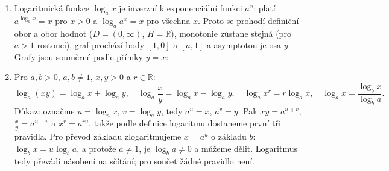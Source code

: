 \begin{enumerate}[label=\textbf{\arabic*.}, leftmargin=*, itemsep=0.8em]
  \item {}
  Logaritmická funkce $\log_a x$ je inverzní k exponenciální funkci $a^x$: platí $a^{\log_a x} = x$ pro $x > 0$ a $\log_a a^x = x$ pro všechna $x$. Proto se prohodí definiční obor a obor hodnot ($D = (0, \infty)$, $H = \mathbb{R}$), monotonie zůstane stejná (pro $a > 1$ rostoucí), graf prochází body $[1, 0]$ a $[a, 1]$ a asymptotou je osa $y$. Grafy jsou souměrné podle přímky $y = x$:
  \begin{center}
  \end{center}

  \item {}
  Pro $a, b > 0$, $a, b\neq 1$, $x, y > 0$ a $r\in\mathbb{R}$:
  \begin{equation*}
    \log_a(xy) = \log_a x + \log_a y,\quad \log_a\frac{x}{y} = \log_a x - \log_a y,\quad \log_a x^r = r\log_a x,\quad \log_a x = \frac{\log_b x}{\log_b a}.
  \end{equation*}
  Důkaz: označme $u = \log_a x$, $v = \log_a y$, tedy $a^u = x$, $a^v = y$. Pak $xy = a^{u + v}$, $\frac{x}{y} = a^{u - v}$ a $x^r = a^{ru}$, takže podle definice logaritmu dostaneme první tři pravidla. Pro převod základu zlogaritmujeme $x = a^u$ o základu $b$: $\log_b x = u\log_b a$, a protože $a\neq 1$, je $\log_b a\neq 0$ a můžeme dělit. Logaritmus tedy převádí násobení na sčítání; pro součet žádné pravidlo není. 


\end{enumerate}
